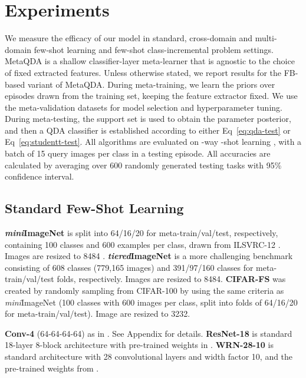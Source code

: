 \documentclass[10pt,twocolumn,letterpaper]{article}
\def\tierIN{\textit{tiered}ImageNet}
\def\miniIN{\textit{mini}ImageNet}
\begin{document}
\section{Experiments}

We measure the efficacy of our model in standard, cross-domain and multi-domain few-shot learning and few-shot class-incremental problem settings. MetaQDA is a shallow classifier-layer meta-learner that is agnostic to the choice of fixed extracted features. Unless otherwise stated, we report results for the FB-based variant of MetaQDA.
During meta-training, we learn the priors  over episodes drawn from the training set, keeping the feature extractor fixed. We use the meta-validation datasets for model selection and hyperparameter tuning. During meta-testing, the support set is used to obtain the parameter posterior, and then a QDA classifier is established according to either Eq~\ref{eq:qda-test} or Eq~\ref{eq:studentt-test}. All algorithms are evaluated on -way -shot learning \cite{snell2017prototypical}, with a batch of 15 query images per class in a testing episode. All accuracies are calculated by averaging over 600 randomly generated testing tasks with 95\% confidence interval.

\subsection{Standard Few-Shot Learning}

\textbf{\miniIN} \cite{ravi2017optimization} is split into 64/16/20 for meta-train/val/test, respectively, containing 100 classes and 600 examples per class, drawn from ILSVRC-12 \cite{russakovsky2015imagenet}. Images are resized to 8484 \cite{he2016deep}.
\textbf{\tierIN} is a more challenging benchmark \cite{ren2018meta} consisting of 608 classes (779,165 images) and 391/97/160 classes for meta-train/val/test folds, respectively. Images are resized to 8484.
\textbf{CIFAR-FS} \cite{bertinetto2019R2D2} was created by randomly sampling from CIFAR-100 \cite{krizhevsky2009learning} by using the same criteria as \miniIN{} (100 classes with 600 images per class, split into folds of 64/16/20 for meta-train/val/test). Image are resized to 3232.

\textbf{Conv-4} (64-64-64-64) as in \cite{snell2017prototypical}. 
See Appendix for details. 
\textbf{ResNet-18} is standard 18-layer 8-block architecture with pre-trained weights in \cite{wang2019simpleshot}. \textbf{WRN-28-10} is standard architecture with 28 convolutional layers and width factor 10, and the pre-trained weights from \cite{mangla2020charting}.
\end{document}
